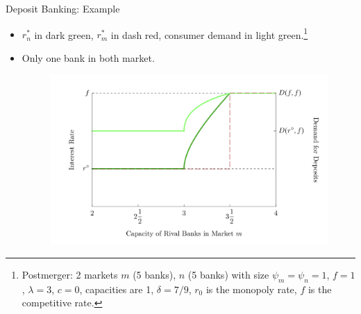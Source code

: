 \documentclass[notes,10.2pt, aspectratio=169]{beamer}
\begin{document}
      
  \begin{frame}{Deposit Banking: Example}
    \begin{itemize}
      \item $r^*_n$ in dark green, $r^*_m$ in dash red, consumer demand in light green.\footnote{Postmerger: 2 markets $m$ (5 banks), $n$ (5 banks) with size $\psi_m = \psi_n = 1$,  
      $f = 1$, $\lambda = 3$, $c = 0$, capacities are 1, $\delta = 7/9$, $r_0$ is the monopoly rate, $f$ is the competitive rate.}
      \item Only one bank in both market. 
      \begin{figure}[t*]
        \centering
        \includegraphics[width=.65\textwidth]{./imgs/figure9.png}
      \end{figure}
  
    
    \end{itemize}
  \end{frame}
  
\end{document}
